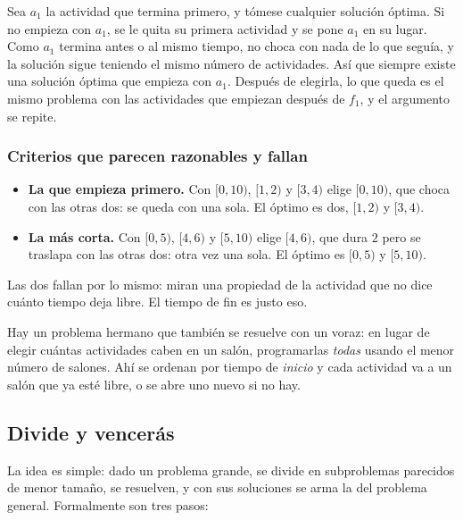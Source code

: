 \documentclass[11pt,letterpaper]{article}
\begin{document}
Sea $a_1$ la actividad que termina primero, y tómese cualquier
solución óptima. Si no empieza con $a_1$, se le quita su primera
actividad y se pone $a_1$ en su lugar. Como $a_1$ termina antes o al
mismo tiempo, no choca con nada de lo que seguía, y la solución sigue
teniendo el mismo número de actividades. Así que siempre existe una
solución óptima que empieza con $a_1$. Después de elegirla, lo que
queda es el mismo problema con las actividades que empiezan después de
$f_1$, y el argumento se repite.

\subsubsection*{Criterios que parecen razonables y fallan}

\begin{itemize}[itemsep=0.3em]
  \item \textbf{La que empieza primero.} Con $[0, 10)$, $[1, 2)$ y
        $[3, 4)$ elige $[0, 10)$, que choca con las otras dos: se
        queda con una sola. El óptimo es dos, $[1, 2)$ y $[3, 4)$.
  \item \textbf{La más corta.} Con $[0, 5)$, $[4, 6)$ y $[5, 10)$
        elige $[4, 6)$, que dura $2$ pero se traslapa con las otras
        dos: otra vez una sola. El óptimo es $[0, 5)$ y $[5, 10)$.
\end{itemize}

Las dos fallan por lo mismo: miran una propiedad de la actividad que
no dice cuánto tiempo deja libre. El tiempo de fin es justo eso.

\begin{observacion}
  Hay un problema hermano que también se resuelve con un voraz: en
  lugar de elegir cuántas actividades caben en un salón, programarlas
  \emph{todas} usando el menor número de salones. Ahí se ordenan por
  tiempo de \emph{inicio} y cada actividad va a un salón que ya esté
  libre, o se abre uno nuevo si no hay.
\end{observacion}


\subsection*{Divide y vencerás}

La idea es simple: dado un problema grande, se divide en subproblemas
parecidos de menor tamaño, se resuelven, y con sus soluciones se arma
la del problema general. Formalmente son tres pasos:
\end{document}
